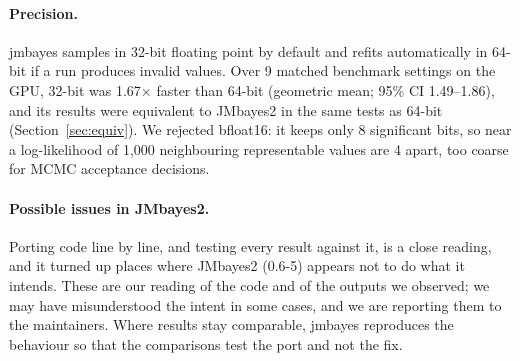 \documentclass[11pt]{article}
\begin{document}
\paragraph{Precision.} jmbayes samples in 32-bit floating point by default and refits
automatically in 64-bit if a run produces invalid values. Over 9 matched benchmark settings
on the GPU, 32-bit was 1.67$\times$ faster than 64-bit (geometric mean; 95\% CI
1.49--1.86), and its results were equivalent to JMbayes2 in the same tests as 64-bit
(Section~\ref{sec:equiv}). We rejected bfloat16: it keeps only 8 significant bits, so near a
log-likelihood of 1,000 neighbouring representable values are 4 apart, too coarse for MCMC
acceptance decisions.

\paragraph{Possible issues in JMbayes2.} Porting code line by line, and testing every
result against it, is a close reading, and it turned up places where JMbayes2 (0.6-5)
appears not to do what it intends. These are our reading of the code and of the outputs
we observed; we may have misunderstood the intent in some cases, and we are reporting them
to the maintainers. Where results stay comparable, jmbayes reproduces the behaviour so
that the comparisons test the port and not the fix.
\end{document}
